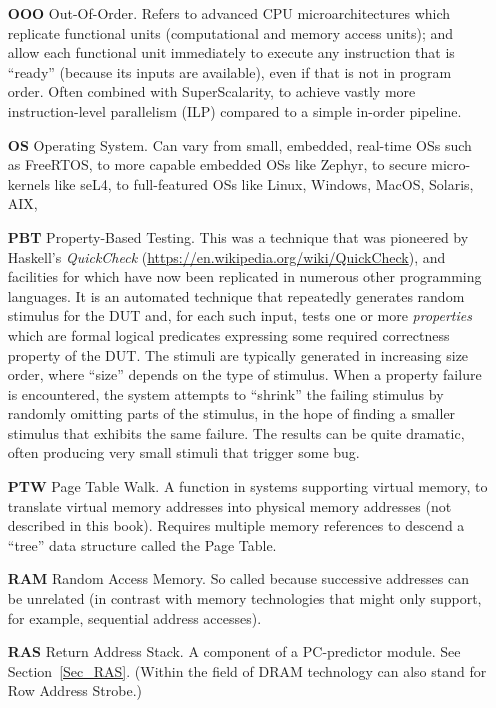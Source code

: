 \begin{itemize}
\item[\bf OOO] Out-Of-Order.  Refers to advanced CPU
  microarchitectures which replicate functional units (computational
  and memory access units); and allow each functional unit immediately
  to execute any instruction that is ``ready'' (because its inputs are
  available), even if that is not in program order.  Often combined
  with SuperScalarity, to achieve vastly more instruction-level
  parallelism (ILP) compared to a simple in-order pipeline.

\item[\bf OS] Operating System.  Can vary from small, embedded,
  real-time OSs such as FreeRTOS, to more capable embedded OSs like
  Zephyr, to secure micro-kernels like seL4, to full-featured OSs like
  Linux, Windows, MacOS, Solaris, AIX, {\etc}

\item[\bf PBT] Property-Based Testing.  This was a technique that was
  pioneered by Haskell's \emph{QuickCheck}
  (\url{https://en.wikipedia.org/wiki/QuickCheck}), and facilities for
  which have now been replicated in numerous other programming
  languages.  It is an automated technique that repeatedly generates
  random stimulus for the DUT and, for each such input, tests one or
  more \emph{properties} which are formal logical predicates
  expressing some required correctness property of the DUT.  The
  stimuli are typically generated in increasing size order, where
  ``size'' depends on the type of stimulus.  When a property failure
  is encountered, the system attempts to ``shrink'' the failing
  stimulus by randomly omitting parts of the stimulus, in the hope of
  finding a smaller stimulus that exhibits the same failure.  The
  results can be quite dramatic, often producing very small stimuli
  that trigger some bug.

\item[\bf PTW] Page Table Walk.  A function in systems supporting
  virtual memory, to translate virtual memory addresses into physical
  memory addresses (not described in this book).  Requires multiple
  memory references to descend a ``tree'' data structure called the
  Page Table.

\item[\bf RAM] Random Access Memory.  So called because successive
  addresses can be unrelated (in contrast with memory technologies
  that might only support, for example, sequential address accesses).

\item[\bf RAS] Return Address Stack.  A component of a PC-predictor
  module.  See Section~\ref{Sec_RAS}.  (Within the field of DRAM
  technology can also stand for Row Address Strobe.)


\end{itemize}
